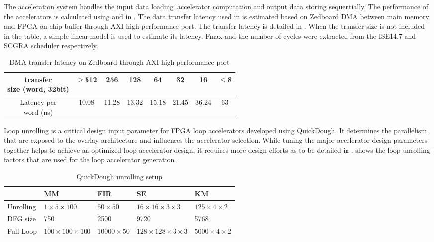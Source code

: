 The acceleration system handles the input data loading, accelerator computation and output data storing sequentially. The performance of the accelerators is calculated using  and  in . The data transfer latency used in  is estimated based on Zedboard DMA between main memory and FPGA on-chip buffer through AXI high-performance port. The transfer latency is detailed in . When the transfer size is not included in the table, a simple linear model is used to estimate its latency. Fmax and the number of cycles were extracted from the ISE14.7 and SCGRA scheduler respectively. 
 
\begin{table}
\footnotesize
    \centering
    \caption{DMA transfer latency on Zedboard through AXI high performance port \label{tab:latency}}{
        \centering
            \begin{tabular}{c|c|c|c|c|c|c|c}
                \hline
                \tabincell{c}{transfer \\ size (word, 32bit)} & $\geq$512 & 256 & 128 & 64 & 32
                                                                  & 16 & $\leq$8  \\ \hline
                \tabincell{c}{Latency per \\ word (ns)}  & 10.08 & 11.28 & 13.32 & 15.18 & 21.45 & 36.24 & 63 \\ \hline
            \end{tabular}
        }
\end{table}

Loop unrolling is a critical design input parameter for FPGA loop accelerators developed using QuickDough. It determines the parallelism that are exposed to the overlay architecture and influences the accelerator selection. While tuning the major accelerator design parameters together helps to achieve an optimized loop accelerator design, it requires more design efforts as to be detailed in .  shows the loop unrolling factors that are used for the loop accelerator generation.

\begin{table}
\footnotesize
\centering
\caption{QuickDough unrolling setup \label{tab:unrolling-setup}}{
        \begin{tabular}{l|l|l|l|l}
            \hline
           & MM & FIR & SE & KM \\ \hline
            Unrolling & $1 \times 5 \times 100$ & $50 \times 50$ & $16 \times 16 \times 3 \times 3$ &
            $125\times 4 \times 2$ \\ \hline
            DFG size & 750 & 2500 & 9720 & 5768 \\ \hline
            Full Loop & $100 \times 100 \times 100$ &  $10000 \times 50$ & $128 \times 128 \times 3
            \times 3$ & $5000 \times 4 \times 2$ \\ \hline
        \end{tabular}
}
\end{table}

